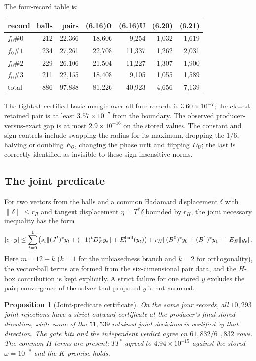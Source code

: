 \documentclass[10pt]{article}
\newtheorem{proposition}[theorem]{Proposition}
\theoremstyle{definition}
\newcommand{\norm}[1]{\lVert #1\rVert}
\newcommand{\abs}[1]{\lvert #1\rvert}
\begin{document}
The four-record table is:
\begin{center}
\begin{tabular}{lrrrrrr}
\toprule
record & balls & pairs & (6.16)O & (6.16)U & (6.20) & (6.21)\\
\midrule
$f_0\#0$ & 212 & 22{,}366 & 18{,}606 & 9{,}254 & 1{,}032 & 1{,}619\\
$f_0\#1$ & 234 & 27{,}261 & 22{,}708 & 11{,}337 & 1{,}262 & 2{,}031\\
$f_0\#2$ & 229 & 26{,}106 & 21{,}504 & 11{,}227 & 1{,}307 & 1{,}900\\
$f_0\#3$ & 211 & 22{,}155 & 18{,}408 & 9{,}105 & 1{,}055 & 1{,}589\\
\midrule
total & 886 & 97{,}888 & 81{,}226 & 40{,}923 & 4{,}656 & 7{,}139\\
\bottomrule
\end{tabular}
\end{center}
The tightest certified basic margin over all four records is $3.60\times10^{-7}$; the closest retained pair is at least $3.57\times10^{-7}$ from the boundary. The observed producer-versus-exact gap is at most $2.9\times10^{-16}$ on the stored values. The constant and sign controls include swapping the radius for its maximum, dropping the $1/6$, halving or doubling $E_O$, changing the phase unit and flipping $D_U$; the last is correctly identified as invisible to these sign-insensitive norms.

\subsection{The joint predicate}

For two vectors from the balls and a common Hadamard displacement $\delta$ with $\norm{\delta}\le r_H$ and tangent displacement $\eta=T^*\delta$ bounded by $r_H$, the joint necessary inequality has the form
\begin{equation}\label{eq:joint}
\abs{c\cdot y}\le \sum_{t=0}^1\left(s_t\norm{(J^t)^*y_t+(-1)^tD_E^*y_e}+E_t^{\rm ball}(y_t)\right)
+r_H\norm{(B^0)^*y_0+(B^1)^*y_1}+E_E\norm{y_e}.
\end{equation}
Here $m=12+k$ ($k=1$ for the unbiasedness branch and $k=2$ for orthogonality), the vector-ball terms are formed from the six-dimensional pair data, and the $H$-box contribution is kept explicitly. A strict failure for one stored $y$ excludes the pair; convergence of the solver that proposed $y$ is not assumed.

\begin{proposition}[Joint-predicate certificate]\label{prop:joint}
On the same four records, all $10{,}293$ joint rejections have a strict outward certificate at the producer's final stored direction, while none of the $51{,}539$ retained joint decisions is certified by that direction. The gate bits and the independent verdict agree on $61{,}832/61{,}832$ rows. The common $H$ terms are present; $TT^*$ agreed to $4.94\times10^{-15}$ against the stored $\omega=10^{-8}$ and the $K$ premise holds.
\end{proposition}
\end{document}
